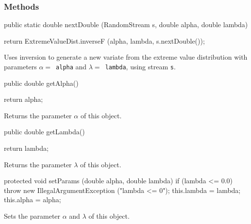 \subsubsection* {Methods}
\begin{code}

   public static double nextDouble (RandomStream s, double alpha,
                                    double lambda) \begin{hide} {
      return ExtremeValueDist.inverseF (alpha, lambda, s.nextDouble());
   }\end{hide}
\end{code}
 \begin{tabb}  Uses inversion to generate a new variate from the extreme value
  distribution with parameters $\alpha = $~\texttt{alpha} and $\lambda =
   $~\texttt{lambda}, using stream \texttt{s}.
 \end{tabb}
\begin{code}

   public double getAlpha()\begin{hide} {
      return alpha;
   }\end{hide}
\end{code}
\begin{tabb} Returns the parameter $\alpha$ of this object.
\end{tabb}
\begin{code}

   public double getLambda()\begin{hide} {
      return lambda;
   }\end{hide}
\end{code}
\begin{tabb} Returns the parameter $\lambda$ of this object.
\end{tabb}
\begin{hide}\begin{code}

   protected void setParams (double alpha, double lambda) {
      if (lambda <= 0.0)
         throw new IllegalArgumentException ("lambda <= 0");
      this.lambda = lambda;
      this.alpha = alpha;
   }
\end{code}
\begin{tabb} Sets the parameter $\alpha$ and $\lambda$ of this object.
\end{tabb}
\begin{code}
}
\end{code}
\end{hide}
